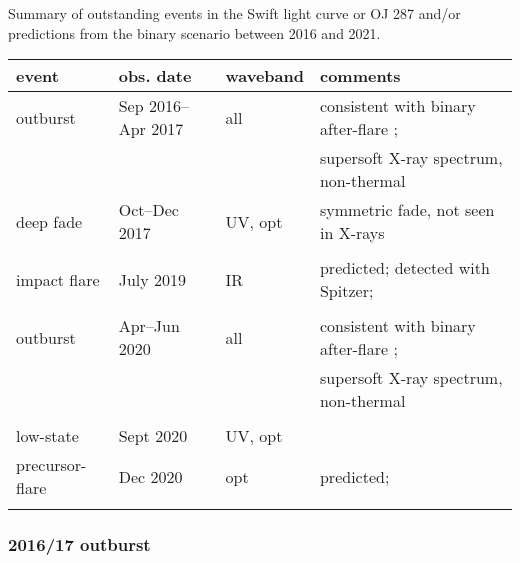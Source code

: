 \documentclass[preprints,article,accept,moreauthors,pdftex]{Definitions/mdpi}
\begin{document}
{%
\begin{specialtable}[H] 
\caption{Summary of outstanding events in the Swift light curve or OJ 287 and/or predictions from the binary scenario between 2016 and 2021.\label{tab2}}
\begin{tabular}{llll}
\toprule
\textbf{event}	& \textbf{obs. date}	& \textbf{waveband} & \textbf{comments} \\
\midrule
outburst & Sep 2016--Apr 2017 & all & consistent with binary after-flare \citep{Valtonen2017}; \\
         &                    &     &   supersoft X-ray spectrum, non-thermal  \\                 
deep fade & Oct--Dec 2017 & UV, opt & symmetric fade, not seen in X-rays \\
 &&& \\
impact flare & July 2019 & IR & predicted; detected with Spitzer; \citep{Laine2020} \\
 &&& \\
outburst & Apr--Jun 2020 & all & consistent with binary after-flare \citep{Komossa2020}; \\
         &                    &     &   supersoft X-ray spectrum,
non-thermal\\
\\ low-state & Sept 2020 & UV, opt & \\
precursor-flare & Dec 2020 & opt & predicted; \citep{Pihajoki2013} \\ 
\bottomrule
\label{tab:tab2}
\end{tabular}
\end{specialtable}

\subsubsection{2016/17 outburst}

}
\end{document}
